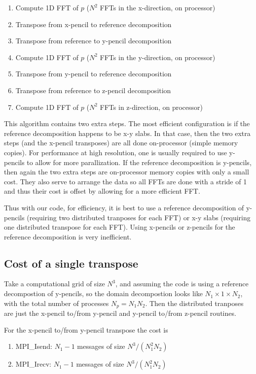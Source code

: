 \documentclass[12pt]{article}
\begin{document}
\begin{enumerate}
\item Compute 1D FFT of $p$ ($N^2$ FFTs in the x-direction, on processor)
\item Transpose from x-pencil to reference decomposition 
\item Transpose from reference to y-pencil decomposition
\item Compute 1D FFT of $p$ ($N^2$ FFTs in the y-direction, on processor)
\item Transpose from y-pencil to reference decomposition
\item Transpose from reference to z-pencil decomposition
\item Compute 1D FFT of $p$ ($N^2$ FFTs in z-direction, on processor)
\end{enumerate}


This algorithm contains two extra steps.  The most efficient
configuration is if the reference decomposition happens to be x-y slabs.
In that case, then the two extra steps (and the x-pencil transposes)
are all done on-processor (simple memory copies).
For performance at high resolution, one is usually required to
use y-pencils to allow for more parallization.  
If the reference decomposition is y-pencils, then again the
two extra steps are on-processor memory copies with only 
a small cost.  They also serve to arrange the data so all
FFTs are done with a stride of 1 and thus their cost is offset
by allowing for a more efficient FFT.

Thus with our code, for efficiency, it is best to use a reference 
decomposition of y-pencils (requiring two distributed tranposes for
each FFT) or x-y slabs (requiring one distributed transpose for each FFT).  
Using x-pencils or z-pencils  for the reference decomposition is very inefficient.  




\subsection{Cost of a single transpose}

Take a computational grid of size $N^3$, and assuming the code is
using a reference decompostion of y-pencils, so the domain
decompostion looks like $N_1 \times 1 \times N_2$, with the total
number of processes $N_p = N_1 N_2 $.   Then the distributed
tranposes are just the x-pencil to/from y-pencil and y-pencil to/from
z-pencil routines.  

For the x-pencil to/from y-pencil transpose the cost is
\begin{enumerate}
\item MPI\_Isend:  $N_1 -1$ messages of size $N^3/(N_1^2 N_2)$
\item MPI\_Irecv:  $N_1 -1$ messages of size $N^3/(N_1^2 N_2)$
\end{enumerate}
\end{document}

